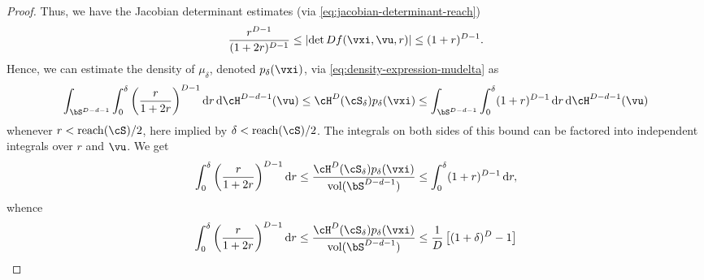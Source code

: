 \documentclass[../../book-main.tex]{subfiles}
\begin{document}
\begin{proof}

    Thus, we have the Jacobian determinant estimates (via \eqref{eq:jacobian-determinant-reach})
    \begin{equation}
        \frac{r^{D-1}}{(1 + 2r)^{D-1}}
        \leq
        \abs{ \det Df(\vxi, \vu, r)}
        \leq
        (1 + r)^{D-1}.
    \end{equation}
    Hence, we can estimate the density of $\mu_{\delta}$, denoted
    $p_{\delta}(\vxi)$, via \eqref{eq:density-expression-mudelta} as 
    \begin{equation}
        \int_{\bS^{D-d-1}}
        \int_0^\delta
        \left( \frac{r}{1 + 2r}\right)^{D-1}
        \odif r \odif \cH^{D-d-1}(\vu)
        \leq
        \cH^{D}(\cS_{\delta})
        p_{\delta}(\vxi)
        \leq
        \int_{\bS^{D-d-1}}
        \int_0^\delta
        (1 + r)^{D-1}
        \odif r \odif \cH^{D-d-1}(\vu)
    \end{equation}
    whenever $ r < \mathrm{reach}(\cS) / 2$, here implied by $\delta
    < \mathrm{reach}(\cS)/2$.
    The integrals on both sides of this bound can be factored into independent
    integrals over $r$ and $\vu$. We get
    \begin{equation}
        \int_0^\delta
        \left( \frac{r}{1 + 2r}\right)^{D-1}
        \odif r
        \leq
        \frac{
            \cH^{D}(\cS_{\delta})
            p_{\delta}(\vxi)
        }{
            \volume(\bS^{D-d-1})
        }
        \leq
        \int_0^\delta
        (1 + r)^{D-1}
        \odif r,
    \end{equation}
    whence
    \begin{equation}
        \int_0^\delta
        \left( \frac{r}{1 + 2r}\right)^{D-1}
        \odif r
        \leq
        \frac{
            \cH^{D}(\cS_{\delta})
            p_{\delta}(\vxi)
        }{
            \volume(\bS^{D-d-1})
        }
        \leq
        \frac{1}{D} \left[
            (1 + \delta)^D - 1
        \right]
    \end{equation}











\end{proof}
\end{document}
